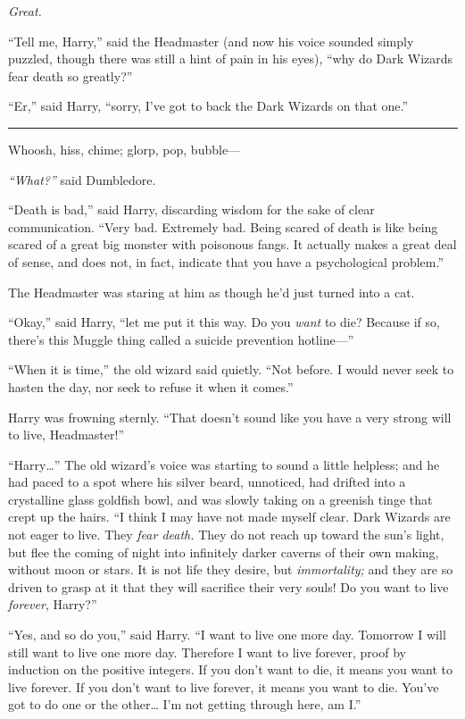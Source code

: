 \emph{Great.}

``Tell me, Harry,'' said the Headmaster (and now his voice sounded
simply puzzled, though there was still a hint of pain in his eyes),
``why do Dark Wizards fear death so greatly?''

``Er,'' said Harry, ``sorry, I've got to back the Dark Wizards on that
one.''

\begin{center}\rule{3in}{0.4pt}\end{center}

Whoosh, hiss, chime; glorp, pop, bubble---

\emph{``What?''} said Dumbledore.

``Death is bad,'' said Harry, discarding wisdom for the sake of clear
communication. ``Very bad. Extremely bad. Being scared of death is like
being scared of a great big monster with poisonous fangs. It actually
makes a great deal of sense, and does not, in fact, indicate that you
have a psychological problem.''

The Headmaster was staring at him as though he'd just turned into a cat.

``Okay,'' said Harry, ``let me put it this way. Do you \emph{want} to
die? Because if so, there's this Muggle thing called a suicide
prevention hotline---''

``When it is time,'' the old wizard said quietly. ``Not before. I would
never seek to hasten the day, nor seek to refuse it when it comes.''

Harry was frowning sternly. ``That doesn't sound like you have a very
strong will to live, Headmaster!''

``Harry\ldots{}'' The old wizard's voice was starting to sound a little
helpless; and he had paced to a spot where his silver beard, unnoticed,
had drifted into a crystalline glass goldfish bowl, and was slowly
taking on a greenish tinge that crept up the hairs. ``I think I may have
not made myself clear. Dark Wizards are not eager to live. They
\emph{fear death.} They do not reach up toward the sun's light, but flee
the coming of night into infinitely darker caverns of their own making,
without moon or stars. It is not life they desire, but
\emph{immortality;} and they are so driven to grasp at it that they will
sacrifice their very souls! Do you want to live \emph{forever}, Harry?''

``Yes, and so do you,'' said Harry. ``I want to live one more day.
Tomorrow I will still want to live one more day. Therefore I want to
live forever, proof by induction on the positive integers. If you don't
want to die, it means you want to live forever. If you don't want to
live forever, it means you want to die. You've got to do one or the
other\ldots{} I'm not getting through here, am I.''

